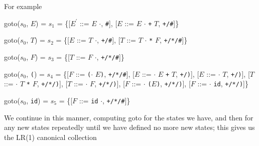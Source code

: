 \documentclass[8pt,a4paper,compress]{beamer}
\newcommand{\mm}[1]{$#1$}
\newcommand{\expo}[2]{$#1^{#2}$}
\newcommand{\subs}[2]{${#1}_{#2}$}
\newenvironment{spaced}
{
\smallskip
\hspace{.5cm}
\begin{minipage}[c]{\textwidth}
}
{
\end{minipage}
\smallskip
}
\begin{document}
\begin{frame}[fragile]
\pause

For example

\text{ }
\begin{spaced}
\begin{production}
goto(\subs{s}{0}, \mm{E}) = \subs{s}{1} = \{[\expo{E}{\prime} ::= \mm{E} \mm{\cdot}, \lstinline{#}],
                            [\mm{E}  ::= \mm{E} \mm{\cdot} \lstinline{+} \mm{T}, \lstinline{+/#}]\}
\end{production}
\end{spaced}

\pause

\text{ }
\begin{spaced}
\begin{production}
goto(\subs{s}{0}, \mm{T}) = \subs{s}{2} = \{[\mm{E}  ::= \mm{T} \mm{\cdot}, \lstinline{+/#}],
                            [\mm{T}  ::= \mm{T} \mm{\cdot} \lstinline{*} \mm{F}, \lstinline{+/*/#}]\}
\end{production}
\end{spaced}

\pause

\text{ }
\begin{spaced}
\begin{production}
goto(\subs{s}{0}, \mm{F}) = \subs{s}{3} = \{[\mm{T}  ::= \mm{F} \mm{\cdot}, \lstinline{+/*/#}]\}
\end{production}
\end{spaced}

\pause

\text{ }
\begin{spaced}
\begin{production}
goto(\subs{s}{0}, \lstinline{(}) = \subs{s}{4} = \{[\mm{F}  ::= \lstinline{(}\mm{\cdot} \mm{E}\lstinline{)},  \lstinline{+/*/#}],
                           [\mm{E}  ::= \mm{\cdot} \mm{E} \lstinline{+} \mm{T}, \lstinline{+/)}],
                           [\mm{E}  ::= \mm{\cdot} \mm{T}, \lstinline{+/)}],
                           [\mm{T}  ::= \mm{\cdot} \mm{T} \lstinline{*} \mm{F}, \lstinline{+/*/)}],
                           [\mm{T}  ::= \mm{\cdot} \mm{F}, \lstinline{+/*/)}],
                           [\mm{F}  ::= \mm{\cdot} \lstinline{(}\mm{E}\lstinline{)}, \lstinline{+/*/)}],
                           [\mm{F}  ::= \mm{\cdot} \lstinline{id}, \lstinline{+/*/)}]\}
\end{production}
\end{spaced}

\pause

\text{ }
\begin{spaced}
\begin{production}
goto(\subs{s}{0}, \lstinline{id}) = \subs{s}{5} = \{[\mm{F}  ::= \lstinline{id} \mm{\cdot}, \lstinline{+/*/#}]\}
\end{production}
\end{spaced}

\pause

We continue in this manner, computing goto for the states we have, and then for any new states repeatedly until we have defined no more new states; this gives us the LR(1) canonical collection
\end{frame}
\end{document}
